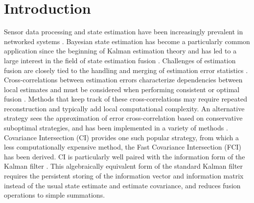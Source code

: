 \documentclass[letterpaper, 10 pt, conference]{ieeeconf}  %
\begin{document}
\section{Introduction}
Sensor data processing and state estimation have been increasingly prevalent in networked systems \cite{ligginsDistributedDataFusion2012}. Bayesian state estimation has become a particularly common application since the beginning of Kalman estimation theory and has led to a large interest in the field of state estimation fusion \cite{willnerKalmanFilterAlgorithms1976,hashemipourDecentralizedStructuresParallel1988,chongFortyYearsDistributed2017}. Challenges of estimation fusion are closely tied to the handling and merging of estimation error statistics \cite{noackTreatmentDependentInformation2017}. Cross-correlations between estimation errors characterize dependencies between local estimates and must be considered when performing consistent or optimal fusion \cite{bar-shalomTracktotrackCorrelationProblem1981,sunMultisensorOptimalInformation2004}. Methods that keep track of these cross-correlations may require repeated reconstruction \cite{steinbringOptimalSamplebasedFusion2016} and typically add local computational complexity. An alternative strategy sees the approximation of error cross-correlation based on conservative suboptimal strategies, and has been implemented in a variety of methods \cite{julierNondivergentEstimationAlgorithm1997,noackDecentralizedDataFusion2017,niehsenInformationFusionBased2002}. Covariance Intersection (CI) \cite{julierNondivergentEstimationAlgorithm1997} provides one such popular strategy, from which a less computationally expensive method, the Fast Covariance Intersection (FCI) \cite{niehsenInformationFusionBased2002} has been derived. CI is particularly well paired with the information form of the Kalman filter \cite{mutambaraDecentralizedEstimationControl1998,pfaffInformationFormDistributed2017}. This algebraically equivalent form of the standard Kalman filter requires the persistent storing of the information vector and information matrix instead of the usual state estimate and estimate covariance, and reduces fusion operations to simple summations. 
\end{document}
